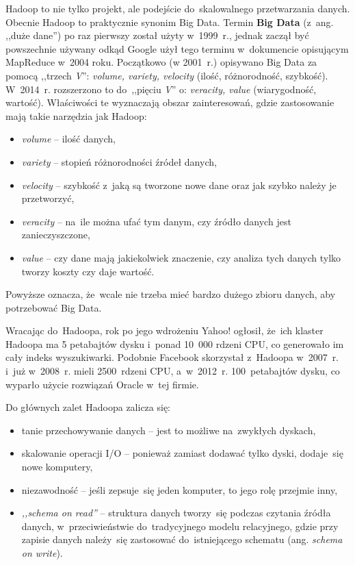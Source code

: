 \documentclass[12pt,a4paper,twoside,titlepage,openright]{book}
\begin{document}
Hadoop to nie tylko projekt, ale podejście do~skalowalnego przetwarzania danych. \cite{hadoop} Obecnie Hadoop to praktycznie synonim Big Data. \cite{bigData} Termin \textbf{Big Data} (z~ang. ,,duże dane'') po raz pierwszy został użyty w~1999~r., jednak zaczął być powszechnie używany odkąd Google użył tego terminu w~dokumencie opisującym MapReduce w~2004 roku. Początkowo (w 2001~r.) opisywano Big Data za pomocą ,,trzech \textit{V}'': \textit{volume, variety, velocity} (ilość, różnorodność, szybkość). W~2014~r. rozszerzono to do~,,pięciu \textit{V}'' o: \textit{veracity, value} (wiarygodność, wartość).\cite{realTimeProcessing} Właściwości te wyznaczają obszar zainteresowań, gdzie zastosowanie mają takie narzędzia jak Hadoop:
\begin{itemize}
\item \textit{volume} -- ilość danych,
\item \textit{variety} -- stopień różnorodności źródeł danych,
\item \textit{velocity} -- szybkość z~jaką są tworzone nowe dane oraz jak szybko należy je przetworzyć,
\item \textit{veracity} -- na~ile można ufać tym danym, czy źródło danych jest zanieczyszczone,
\item \textit{value} -- czy dane mają jakiekolwiek znaczenie, czy analiza tych danych tylko tworzy koszty czy daje wartość.
\end{itemize}
Powyższe oznacza, że~wcale nie trzeba mieć bardzo dużego zbioru danych, aby potrzebować Big Data. \cite{hadoop}

Wracając do~Hadoopa, rok po jego wdrożeniu Yahoo! ogłosił, że~ich klaster Hadoopa ma 5 petabajtów dysku i~ponad 10~000 rdzeni CPU, co generowało im cały indeks wyszukiwarki. Podobnie Facebook skorzystał z~Hadoopa w~2007~r. i~już w~2008~r. mieli 2500~rdzeni CPU, a~w~2012~r. 100~petabajtów dysku, co wyparło użycie rozwiązań Oracle w~tej firmie.

Do głównych zalet Hadoopa zalicza się:
\begin{itemize}
\item tanie przechowywanie danych -- jest to możliwe na~zwykłych dyskach,
\item skalowanie operacji I/O -- ponieważ zamiast dodawać tylko dyski, dodaje~się nowe komputery,
\item niezawodność -- jeśli zepsuje~się jeden komputer, to jego rolę przejmie inny,
\item \textit{,,schema on read''} -- struktura danych tworzy~się podczas czytania źródła danych, w~przeciwieństwie do~tradycyjnego modelu relacyjnego, gdzie przy zapisie danych należy~się zastosować do~istniejącego schematu (ang. \textit{schema on write}).
\end{itemize}
\end{document}
